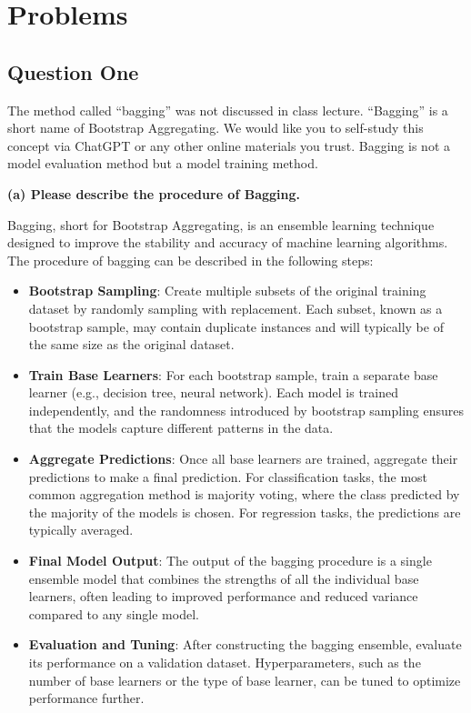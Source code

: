 \section{Problems}

\subsection{Question One}
The method called “bagging” was not discussed in class lecture. “Bagging” is a short name of Bootstrap Aggregating. We would like you to self-study this concept via ChatGPT or any other online materials you trust. Bagging is not a model evaluation method but a model training method.

\textbf{(a) Please describe the procedure of Bagging.}

Bagging, short for Bootstrap Aggregating, is an ensemble learning technique designed to improve the stability and accuracy of machine learning algorithms. The procedure of bagging can be described in the following steps:

\begin{itemize}
    \item \textbf{Bootstrap Sampling}: Create multiple subsets of the original training dataset by randomly sampling with replacement. Each subset, known as a bootstrap sample, may contain duplicate instances and will typically be of the same size as the original dataset.

    \item \textbf{Train Base Learners}: For each bootstrap sample, train a separate base learner (e.g., decision tree, neural network). Each model is trained independently, and the randomness introduced by bootstrap sampling ensures that the models capture different patterns in the data.

    \item \textbf{Aggregate Predictions}: Once all base learners are trained, aggregate their predictions to make a final prediction. For classification tasks, the most common aggregation method is majority voting, where the class predicted by the majority of the models is chosen. For regression tasks, the predictions are typically averaged.

    \item \textbf{Final Model Output}: The output of the bagging procedure is a single ensemble model that combines the strengths of all the individual base learners, often leading to improved performance and reduced variance compared to any single model.

    \item \textbf{Evaluation and Tuning}: After constructing the bagging ensemble, evaluate its performance on a validation dataset. Hyperparameters, such as the number of base learners or the type of base learner, can be tuned to optimize performance further.
\end{itemize}

